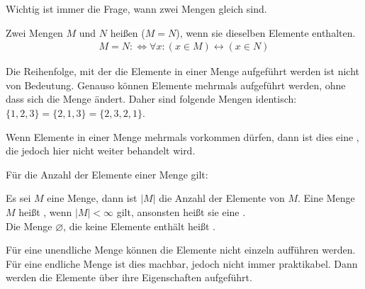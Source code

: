 \begin{Unit} 
Wichtig ist immer die Frage, wann zwei Mengen gleich sind.

\begin{Definition}
  Zwei Mengen $M$ und $N$ heißen  ($M = N$), wenn sie 
  dieselben Elemente enthalten.
  \begin{align}
    M = N :\Leftrightarrow \forall x : (x \in M) \leftrightarrow (x \in N)
  \end{align}
\end{Definition}

Die Reihenfolge, mit der die Elemente in einer Menge aufgeführt werden ist nicht 
von Bedeutung. Genauso können Elemente mehrmals aufgeführt werden, ohne dass 
sich die Menge ändert. Daher sind folgende Mengen identisch: 
$\{1, 2, 3\} = \{ 2, 1, 3\} = \{2, 3, 2, 1\}$.
\end{Unit}

\begin{Unit}[Anmerkung]
Wenn Elemente in einer Menge mehrmals vorkommen dürfen, dann ist dies eine  
, die jedoch hier nicht weiter behandelt wird.
\end{Unit}


\begin{Unit}
Für die Anzahl der Elemente einer Menge gilt:

\begin{Definition}
  Es sei $M$ eine Menge, dann ist $|M|$ die Anzahl der Elemente von $M$. Eine 
  Menge $M$ heißt , wenn 
  $|M| < \infty$ gilt, ansonsten heißt sie eine 
  . \\
  Die Menge $\varnothing$, die keine Elemente enthält heißt 
  .
\end{Definition}

Für eine unendliche Menge können die Elemente nicht einzeln aufführen werden. 
Für eine endliche Menge ist dies machbar, jedoch nicht immer praktikabel. Dann 
werden die Elemente über ihre Eigenschaften aufgeführt.
\end{Unit}

